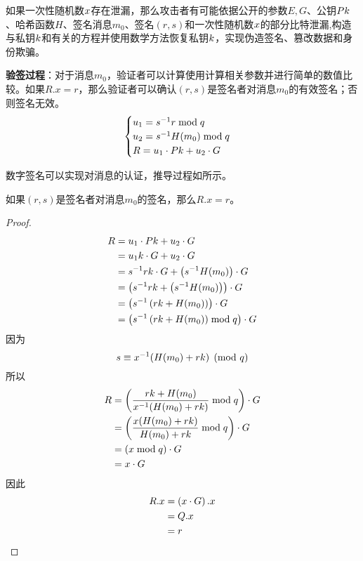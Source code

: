 {	如果一次性随机数$x$存在泄漏，那么攻击者有可能依据公开的参数$E,G$、公钥$Pk$、哈希函数$H$、签名消息$m_0$、签名$(r,s)$和一次性随机数$x$的部分比特泄漏,构造与私钥$k$和有关的方程并使用数学方法恢复私钥$k$，实现伪造签名、篡改数据和身份欺骗。
	
	\textbf{验签过程}：对于消息$m_0$，验证者可以计算使用计算相关参数并进行简单的数值比较。如果$R.x=r$，那么验证者可以确认$(r,s)$是签名者对消息$m_0$的有效签名；否则签名无效。
	\begin{equation}\label{eq:prepare-verify}
	\begin{cases}
		u_1=s^{-1}r\bmod q\\
		u_2=s^{-1}H(m_0)\bmod q\\
		R=u_1\cdot Pk+u_2\cdot G
	\end{cases}
	\end{equation}
	
	数字签名可以实现对消息的认证，推导过程如所示。
	
	\begin{proposition}\label{prop:ECDSA-authentication}
		如果$(r,s)$是签名者对消息$m_0$的签名，那么$R.x=r$。 
	\end{proposition}
	\begin{proof}
		\begin{align*}
		R&=u_1\cdot Pk+u_2\cdot G \\
		&= u_1k\cdot G+u_2\cdot G \\
		&= s^{-1}rk\cdot G+\left(s^{-1}H(m_0)\right)\cdot G \\
		&= \left(s^{-1}rk+\left(s^{-1}H(m_0)\right)\right)\cdot G \\
		&= \left(s^{-1}\left(rk+H(m_0)\right)\right)\cdot G \\
		&= \left(s^{-1}\left(rk+H(m_0)\right)\bmod q\right)\cdot G
		\end{align*}
		因为$$s\equiv x^{-1}(H(m_0)+rk) \pmod q$$
		所以\begin{align*}
		R&= \left(\frac{rk+H(m_0)}{x^{-1}(H(m_0)+rk)}\bmod q\right)\cdot G \\
		&= \left(\frac{x(H(m_0)+rk)}{H(m_0)+rk}\bmod q\right)\cdot G \\
		&= \left(x\bmod q\right)\cdot G \\
		&= x\cdot G
		\end{align*}
		因此\begin{align*}
		R.x&=\left(x\cdot G\right).x\\
		&=Q.x\\
		&=r
		\end{align*}
	\end{proof}
	
}

